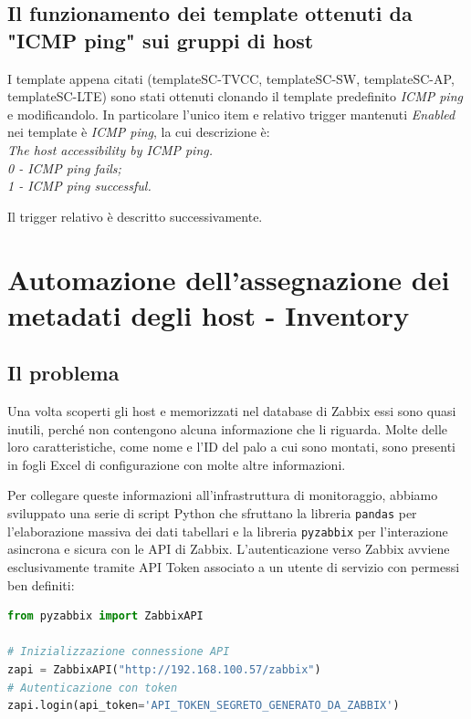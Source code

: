 \documentclass[12pt, a4paper]{report}
\begin{document}
\section{Il funzionamento dei template ottenuti da "ICMP ping" sui gruppi di host}%
I template appena citati (templateSC-TVCC, templateSC-SW, templateSC-AP, \\templateSC-LTE) 
sono stati ottenuti clonando il template predefinito \emph{ICMP ping} e modificandolo.
In particolare l'unico item e relativo trigger mantenuti \emph{Enabled} nei template è \emph{ICMP ping}, 
la cui descrizione è: \\\emph{The host accessibility by ICMP ping.\\
0 - ICMP ping fails;\\
1 - ICMP ping successful.}

Il trigger relativo è descritto successivamente.

\chapter{Automazione dell'assegnazione dei metadati degli host - Inventory}

\section{Il problema}
Una volta scoperti gli host e memorizzati nel database di Zabbix essi sono quasi inutili, 
perché non contengono alcuna informazione che li riguarda. 
Molte delle loro caratteristiche, come nome e l'ID del palo a cui sono montati, 
sono presenti in fogli Excel di configurazione con molte altre informazioni.

Per collegare queste informazioni all'infrastruttura di monitoraggio,
abbiamo sviluppato una serie di script Python che sfruttano la libreria \texttt{pandas} 
per l'elaborazione massiva dei dati tabellari e la libreria \texttt{pyzabbix} 
per l'interazione asincrona e sicura con le API di Zabbix. 
L'autenticazione verso Zabbix avviene esclusivamente tramite API Token associato a un utente di
servizio con permessi ben definiti:

\begin{lstlisting}[language=Python, caption=Autenticazione tramite API Token]
from pyzabbix import ZabbixAPI

# Inizializzazione connessione API
zapi = ZabbixAPI("http://192.168.100.57/zabbix")
# Autenticazione con token 
zapi.login(api_token='API_TOKEN_SEGRETO_GENERATO_DA_ZABBIX')
\end{lstlisting}
\end{document}
